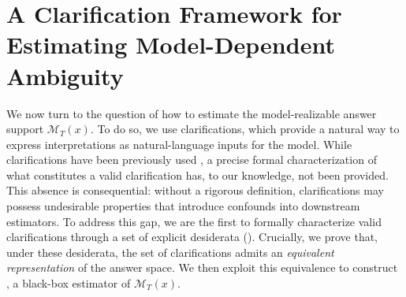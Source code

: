 \section{A Clarification Framework for Estimating Model-Dependent Ambiguity}

We now turn to the question of how to estimate the model-realizable answer support \(\mathcal{M}_T(x)\). To do so, we use clarifications, which provide a natural way to express interpretations as natural-language inputs for the model.
While clarifications have been previously used \citep{min-etal-2020-ambigqa,
kim-etal-2023-tree,
pmlr-v235-hou24b,
rosseeuw2025clara},  a precise formal characterization of what constitutes a valid clarification has, to our knowledge, not been provided. This absence is consequential: without a rigorous definition, clarifications may possess undesirable properties that introduce confounds into downstream estimators. To address this gap, we are the first to formally characterize valid clarifications through a set of explicit desiderata (). Crucially, we prove that, under these desiderata, the set of clarifications admits an \emph{equivalent representation} of the answer space. We then exploit this equivalence to construct \circleclar{}, a black-box estimator of $\mathcal{M}_T(x)$.





